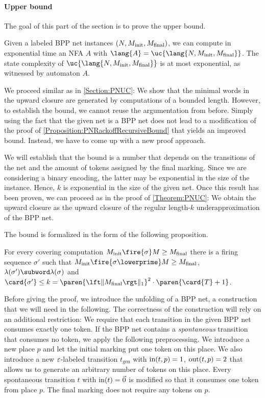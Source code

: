 \documentclass[../../diss.tex]{subfiles}
\begin{document}
\paragraph{Upper bound}

The goal of this part of the section is to prove the upper bound.

\begin{theorem}%
\label{Theorem:BPPUC}%
    Given a labeled BPP net instances $(N,M_{\text{init}},M_{\text{final}})$, we can compute in exponential time an NFA $A$ with $\lang{A} = \uc{\lang{N,\Minit,\Mfinal}}$.
    The state complexity of $\uc{\lang{N,\Minit,\Mfinal}}$ is at most exponential, as witnessed by automaton $A$.
\end{theorem}

We proceed similar as in \cref{Section:PNUC}:
We show that the minimal words in the upward closure are generated by computations of a bounded length.
However, to establish the bound, we cannot reuse the argumentation from before.
Simply using the fact that the given net is a BPP net does not lead to a modification of the proof of \cref{Proposition:PNRackoffRecursiveBound} that yields an improved bound.
Instead, we have to come up with a new proof approach.

We will establish that the bound is a number that depends on the transitions of the net and the amount of tokens assigned by the final marking.
Since we are considering a binary encoding, the latter may be exponential in the size of the instance.
Hence, $k$ is exponential in the size of the given net.
Once this result has been proven, we can proceed as in the proof of \cref{Theorem:PNUC}: We obtain the upward closure as the upward closure of the regular length-$k$ underapproximation of the BPP net.

The bound is formalized in the form of the following proposition.

\begin{proposition}%
\label{Proposition:BPPBound}%
    For every covering computation $\Minit \fire{\sigma} M \geq \Mfinal$ there is a firing sequence $\sigma'$ such that $\Minit \fire{\sigma\lowerprime} M \geq \Mfinal$, $\lambda(\sigma') \subword \lambda(\sigma)$ and $\card{\sigma'} \leq k = \paren{\normone{\Mfinal}}^2 \cdot \paren{\card{T} + 1}$.
\end{proposition}

Before giving the proof, we introduce the unfolding of a BPP net, a construction that we will need in the following.
The correctness of the construction will rely on an additional restriction:
We require that each transition in the given BPP net consumes exactly one token.
If the BPP net contains a \emph{spontaneous} transition that consumes no token, we apply the following preprocessing.
We introduce a new place $p$ and let the initial marking put one token on this place.
We also introduce a new $\varepsilon$-labeled transition $t_{\text{gen}}$ with $\text{in}(t,p) = 1$, $\text{out}(t,p) = 2$ that allows us to generate an arbitrary number of tokens on this place.
Every spontaneous transition $t$ with $\text{in}(t) = \vec{0}$ is modified so that it consumes one token from place $p$.
The final marking does not require any tokens on $p$.
\end{document}

